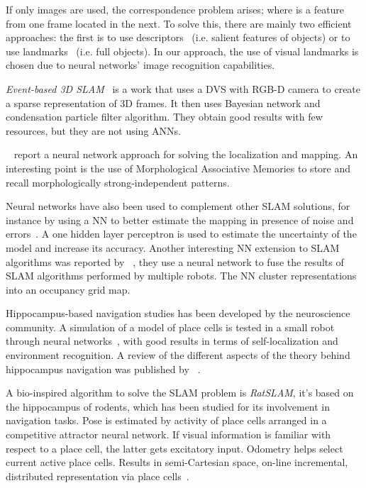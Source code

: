 If only images are used, the correspondence problem arises; where is a feature from one frame located in the next. To solve this, there are mainly two efficient approaches: the first is to use descriptors~\cite{lowe1999object,bay2006surf,alahi2012freak} (i.e. salient features of objects) or to use landmarks~\cite{sola2012impact,frintrop2006attentional} (i.e. full objects). In our approach, the use of visual landmarks is chosen due to neural networks' image recognition capabilities. 


\emph{Event-based 3D SLAM}~\cite{Weikersdorfer2014} is a work that uses a DVS  with RGB-D camera to create a sparse representation of 3D frames. It then uses Bayesian network and condensation particle filter algorithm. They obtain good results with few resources, but they are not using ANNs.

\citeauthor{villaverde2006morphological}~\cite{villaverde2006morphological} report a neural network approach for solving the localization and mapping. An interesting point is the use of Morphological Associative Memories to store and recall morphologically strong-independent patterns. 

Neural networks have also been used to complement other SLAM solutions, for instance by using a NN to better estimate the mapping in presence of noise and errors~\cite{choi2007neural}. A one hidden layer perceptron is used to estimate the uncertainty of the model and increase its accuracy. Another interesting NN extension to SLAM algorithms was reported by \citeauthor{saeedi2011neural}~\cite{saeedi2011neural}, they use a neural network to fuse the results of SLAM algorithms performed by multiple robots. The NN cluster representations into an occupancy grid map.

Hippocampus-based navigation studies has been developed by the neuroscience community. A simulation of a model of place cells is tested in a small robot through neural networks~\cite{burgess1997robotic}, with good results in terms of self-localization and environment recognition. A review of the different aspects of the theory behind hippocampus navigation was published by \citeauthor{sunderhauf2010learning}~\cite{sunderhauf2010learning}. 

A bio-inspired algorithm to solve the SLAM problem is \emph{RatSLAM}, it's based on the hippocampus of rodents, which has been studied for its involvement in navigation tasks. Pose is estimated by activity of place cells arranged in a competitive attractor neural network. If visual information is familiar with respect to a place cell, the latter gets excitatory input. Odometry helps select current active place cells. Results in semi-Cartesian space, on-line incremental, distributed representation via place cells~\cite{rat-slam,milford2008robot}.
